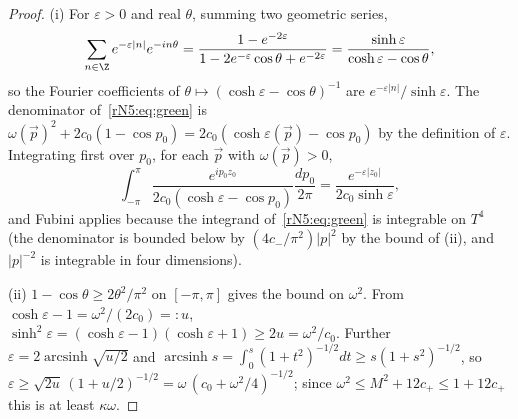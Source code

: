 \begin{proof}
(i) For $\varepsilon>0$ and real $\theta$, summing two geometric series,
\[
\sum_{n\in\Z}e^{-\varepsilon|n|}e^{-in\theta}=\frac{1-e^{-2\varepsilon}}{1-2e^
{-\varepsilon}\cos\theta+e^{-2\varepsilon}}=\frac{\sinh\varepsilon}{\cosh
\varepsilon-\cos\theta},
\]
so the Fourier coefficients of $\theta\mapsto(\cosh\varepsilon-\cos\theta)^{-1}$
are $e^{-\varepsilon|n|}/\sinh\varepsilon$. The denominator
of~\eqref{rN5:eq:green} is $\omega(\vec p)^2+2c_0(1-\cos p_0)=2c_0(\cosh
\varepsilon(\vec p)-\cos p_0)$ by the definition of $\varepsilon$. Integrating
first over $p_0$, for each $\vec p$ with $\omega(\vec p)>0$,
\[
\int_{-\pi}^\pi\frac{e^{ip_0z_0}}{2c_0(\cosh\varepsilon-\cos p_0)}\frac
{dp_0}{2\pi}=\frac{e^{-\varepsilon|z_0|}}{2c_0\sinh\varepsilon},
\]
and Fubini applies because the integrand of~\eqref{rN5:eq:green} is
integrable on $T^4$ (the denominator is bounded below by
$(4c_-/\pi^2)|p|^2$ by the bound of (ii), and $|p|^{-2}$ is integrable in
four dimensions).

(ii) $1-\cos\theta\ge2\theta^2/\pi^2$ on $[-\pi,\pi]$ gives the bound on
$\omega^2$. From $\cosh\varepsilon-1=\omega^2/(2c_0)=:u$,
$\sinh^2\varepsilon=(\cosh\varepsilon-1)(\cosh\varepsilon+1)\ge2u=\omega^2/c_0$.
Further $\varepsilon=2\operatorname{arcsinh}\sqrt{u/2}$ and
$\operatorname{arcsinh}s=\int_0^s(1+t^2)^{-1/2}dt\ge s(1+s^2)^{-1/2}$, so
$\varepsilon\ge\sqrt{2u}\,(1+u/2)^{-1/2}=\omega\,(c_0+\omega^2/4)^{-1/2}$;
since $\omega^2\le M^2+12c_+\le1+12c_+$ this is at least $\kappa\omega$.


\end{proof}
